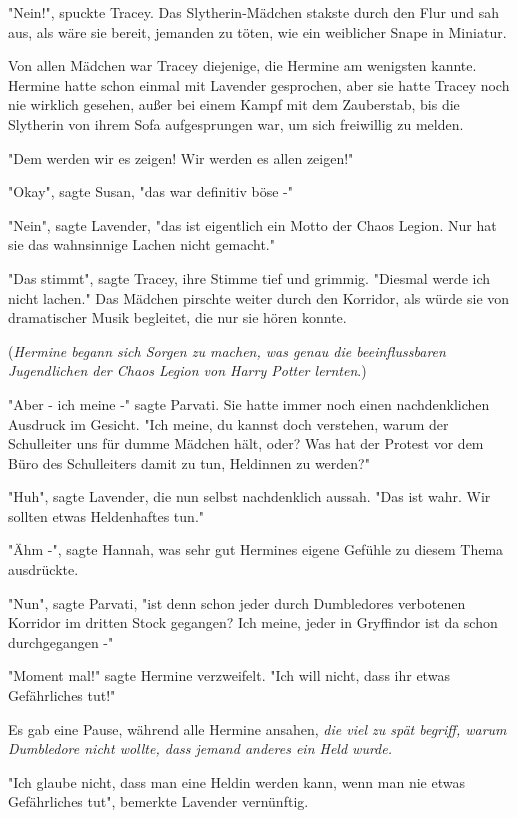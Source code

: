 {"Nein!", spuckte Tracey. Das Slytherin-Mädchen stakste durch den Flur und sah aus, als wäre sie bereit, jemanden zu töten, wie ein weiblicher Snape in Miniatur.

Von allen Mädchen war Tracey diejenige, die Hermine am wenigsten kannte. Hermine hatte schon einmal mit Lavender gesprochen, aber sie hatte Tracey noch nie wirklich gesehen, außer bei einem Kampf mit dem Zauberstab, bis die Slytherin von ihrem Sofa aufgesprungen war, um sich freiwillig zu melden.

"Dem werden wir es zeigen! Wir werden es allen zeigen!"

"Okay", sagte Susan, "das war definitiv böse -"

"Nein", sagte Lavender, "das ist eigentlich ein Motto der Chaos Legion. Nur hat sie das wahnsinnige Lachen nicht gemacht."

"Das stimmt", sagte Tracey, ihre Stimme tief und grimmig. "Diesmal werde ich nicht lachen." Das Mädchen pirschte weiter durch den Korridor, als würde sie von dramatischer Musik begleitet, die nur sie hören konnte.

(\emph{Hermine begann sich Sorgen zu machen, was genau die beeinflussbaren Jugendlichen der Chaos Legion von Harry Potter lernten}.)

"Aber - ich meine -" sagte Parvati. Sie hatte immer noch einen nachdenklichen Ausdruck im Gesicht. "Ich meine, du kannst doch verstehen, warum der Schulleiter uns für dumme Mädchen hält, oder? Was hat der Protest vor dem Büro des Schulleiters damit zu tun, Heldinnen zu werden?"

"Huh", sagte Lavender, die nun selbst nachdenklich aussah. "Das ist wahr. Wir sollten etwas Heldenhaftes tun."

"Ähm -", sagte Hannah, was sehr gut Hermines eigene Gefühle zu diesem Thema ausdrückte.

"Nun", sagte Parvati, "ist denn schon jeder durch Dumbledores verbotenen Korridor im dritten Stock gegangen? Ich meine, jeder in Gryffindor ist da schon durchgegangen -"

"Moment mal!" sagte Hermine verzweifelt. "Ich will nicht, dass ihr etwas Gefährliches tut!"

Es gab eine Pause, während alle Hermine ansahen, \emph{die viel zu spät begriff, warum Dumbledore nicht wollte, dass jemand anderes ein Held wurde.}

"Ich glaube nicht, dass man eine Heldin werden kann, wenn man nie etwas Gefährliches tut", bemerkte Lavender vernünftig.

}

